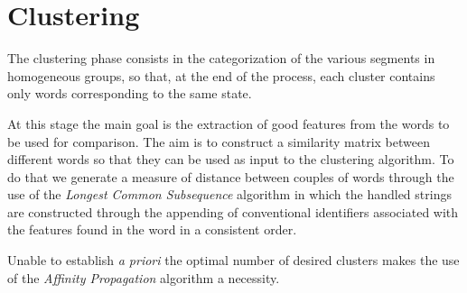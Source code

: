 \section{Clustering}
\label{Nostro_prog}
The clustering phase consists in the categorization of the various segments in homogeneous groups, so that, at the end of the process, each cluster contains only words corresponding to the same state.

At this stage the main goal is the extraction of good features from the words to be used for comparison. The aim is to construct a similarity matrix between different words so that they can be used as input to the clustering algorithm. To do that we generate a measure of distance between couples of words through the use of the \emph{Longest Common Subsequence} algorithm in which the handled strings  are constructed through the appending of conventional identifiers associated with the features found in the word in a consistent order. 

Unable to establish \emph{a priori} the optimal number of desired clusters makes the use of the \emph{Affinity Propagation} algorithm a necessity.
